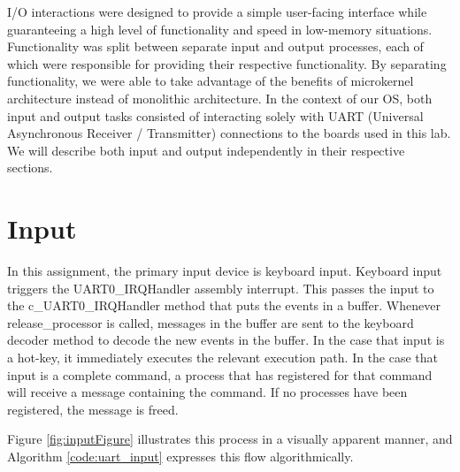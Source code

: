 \documentclass[12pt]{report}
\begin{document}
    I/O interactions were designed to provide a simple user-facing interface
    while guaranteeing a high level of functionality and speed in low-memory
    situations. Functionality was split between separate input and output
    processes, each of which were responsible for providing their respective
    functionality. By separating functionality, we were able to take advantage
    of the benefits of microkernel architecture instead of monolithic
    architecture.
    In the context of our OS, both input and output tasks consisted of %
    interacting solely with UART (Universal Asynchronous Receiver / Transmitter)
    connections to the boards used in this lab.
    We will describe both input and output independently in their respective
    sections.

\section{Input}
\label{sec:Input}
    In this assignment, the primary input device is keyboard input.
    Keyboard input triggers the UART0\_IRQHandler assembly interrupt. This
    passes the input to the c\_UART0\_IRQHandler method that puts the events
    in a buffer. Whenever release\_processor is called, messages in the
    buffer are sent to the keyboard decoder method to decode the new
    events in the buffer. In the case that input is a hot-key,
    it immediately executes the relevant execution path. In the case that input
    is a complete command, a process that has registered for that command will
    receive a message containing the command. If no processes have been
    registered, the message is freed.

    Figure \ref{fig:inputFigure} illustrates this process in a visually
    apparent manner, and Algorithm \ref{code:uart_input} expresses this flow
    algorithmically.
\end{document}
